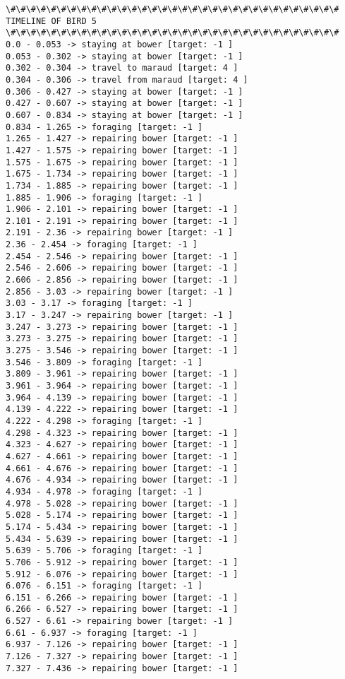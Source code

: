 \documentclass[11pt]{article}
\begin{document}
\begin{Verbatim}[commandchars=\\\{\}]
\#\#\#\#\#\#\#\#\#\#\#\#\#\#\#\#\#\#\#\#\#\#\#\#\#\#\#\#\#\#\#\#\#
TIMELINE OF BIRD 5
\#\#\#\#\#\#\#\#\#\#\#\#\#\#\#\#\#\#\#\#\#\#\#\#\#\#\#\#\#\#\#\#\#
0.0 - 0.053 -> staying at bower [target: -1 ]
0.053 - 0.302 -> staying at bower [target: -1 ]
0.302 - 0.304 -> travel to maraud [target: 4 ]
0.304 - 0.306 -> travel from maraud [target: 4 ]
0.306 - 0.427 -> staying at bower [target: -1 ]
0.427 - 0.607 -> staying at bower [target: -1 ]
0.607 - 0.834 -> staying at bower [target: -1 ]
0.834 - 1.265 -> foraging [target: -1 ]
1.265 - 1.427 -> repairing bower [target: -1 ]
1.427 - 1.575 -> repairing bower [target: -1 ]
1.575 - 1.675 -> repairing bower [target: -1 ]
1.675 - 1.734 -> repairing bower [target: -1 ]
1.734 - 1.885 -> repairing bower [target: -1 ]
1.885 - 1.906 -> foraging [target: -1 ]
1.906 - 2.101 -> repairing bower [target: -1 ]
2.101 - 2.191 -> repairing bower [target: -1 ]
2.191 - 2.36 -> repairing bower [target: -1 ]
2.36 - 2.454 -> foraging [target: -1 ]
2.454 - 2.546 -> repairing bower [target: -1 ]
2.546 - 2.606 -> repairing bower [target: -1 ]
2.606 - 2.856 -> repairing bower [target: -1 ]
2.856 - 3.03 -> repairing bower [target: -1 ]
3.03 - 3.17 -> foraging [target: -1 ]
3.17 - 3.247 -> repairing bower [target: -1 ]
3.247 - 3.273 -> repairing bower [target: -1 ]
3.273 - 3.275 -> repairing bower [target: -1 ]
3.275 - 3.546 -> repairing bower [target: -1 ]
3.546 - 3.809 -> foraging [target: -1 ]
3.809 - 3.961 -> repairing bower [target: -1 ]
3.961 - 3.964 -> repairing bower [target: -1 ]
3.964 - 4.139 -> repairing bower [target: -1 ]
4.139 - 4.222 -> repairing bower [target: -1 ]
4.222 - 4.298 -> foraging [target: -1 ]
4.298 - 4.323 -> repairing bower [target: -1 ]
4.323 - 4.627 -> repairing bower [target: -1 ]
4.627 - 4.661 -> repairing bower [target: -1 ]
4.661 - 4.676 -> repairing bower [target: -1 ]
4.676 - 4.934 -> repairing bower [target: -1 ]
4.934 - 4.978 -> foraging [target: -1 ]
4.978 - 5.028 -> repairing bower [target: -1 ]
5.028 - 5.174 -> repairing bower [target: -1 ]
5.174 - 5.434 -> repairing bower [target: -1 ]
5.434 - 5.639 -> repairing bower [target: -1 ]
5.639 - 5.706 -> foraging [target: -1 ]
5.706 - 5.912 -> repairing bower [target: -1 ]
5.912 - 6.076 -> repairing bower [target: -1 ]
6.076 - 6.151 -> foraging [target: -1 ]
6.151 - 6.266 -> repairing bower [target: -1 ]
6.266 - 6.527 -> repairing bower [target: -1 ]
6.527 - 6.61 -> repairing bower [target: -1 ]
6.61 - 6.937 -> foraging [target: -1 ]
6.937 - 7.126 -> repairing bower [target: -1 ]
7.126 - 7.327 -> repairing bower [target: -1 ]
7.327 - 7.436 -> repairing bower [target: -1 ]

\end{Verbatim}
\end{document}
